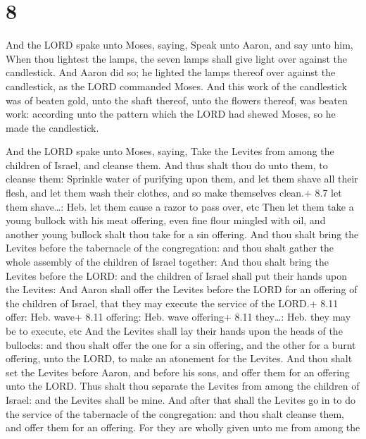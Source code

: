 \hypertarget{section-7}{%
\section{8}\label{section-7}}

 And the LORD spake unto Moses, saying,  Speak
unto Aaron, and say unto him, When thou lightest the lamps, the seven
lamps shall give light over against the candlestick.  And
Aaron did so; he lighted the lamps thereof over against the candlestick,
as the LORD commanded Moses.  And this work of the
candlestick was of beaten gold, unto the shaft thereof, unto the flowers
thereof, was beaten work: according unto the pattern which the LORD had
shewed Moses, so he made the candlestick.

 And the LORD spake unto Moses, saying,  Take
the Levites from among the children of Israel, and cleanse them.
 And thus shalt thou do unto them, to cleanse them: Sprinkle
water of purifying upon them, and let them shave all their flesh, and
let them wash their clothes, and so make themselves clean.+ 8.7 let them
shave\ldots: Heb. let them cause a razor to pass over, etc 
Then let them take a young bullock with his meat offering, even fine
flour mingled with oil, and another young bullock shalt thou take for a
sin offering.  And thou shalt bring the Levites before the
tabernacle of the congregation: and thou shalt gather the whole assembly
of the children of Israel together:  And thou shalt bring
the Levites before the LORD: and the children of Israel shall put their
hands upon the Levites:  And Aaron shall offer the Levites
before the LORD for an offering of the children of Israel, that they may
execute the service of the LORD.+ 8.11 offer: Heb. wave+ 8.11 offering:
Heb. wave offering+ 8.11 they\ldots: Heb. they may be to execute, etc
 And the Levites shall lay their hands upon the heads of
the bullocks: and thou shalt offer the one for a sin offering, and the
other for a burnt offering, unto the LORD, to make an atonement for the
Levites.  And thou shalt set the Levites before Aaron, and
before his sons, and offer them for an offering unto the LORD.
 Thus shalt thou separate the Levites from among the
children of Israel: and the Levites shall be mine.  And
after that shall the Levites go in to do the service of the tabernacle
of the congregation: and thou shalt cleanse them, and offer them for an
offering.  For they are wholly given unto me from among the
